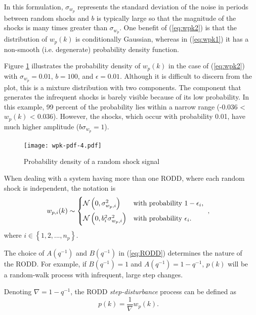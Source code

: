 In this formulation, $\sigma_{w_p}$ represents the standard deviation of the noise in periods between random shocks and $b$ is typically large so that the magnitude of the shocks is many times greater than $\sigma_{w_p}$. One benefit of (\ref{eq:wpk2}) is that the distribution of $w_p(k)$ is conditionally Gaussian, whereas in (\ref{eq:wpk1}) it has a non-smooth (i.e. degenerate) probability density function.

Figure \ref{fig:wpk-pdf} illustrates the probability density of $w_p(k)$ in the case of (\ref{eq:wpk2}) with $\sigma_{w_p}=0.01$, $b=100$, and $\epsilon=0.01$. Although it is difficult to discern from the plot, this is a mixture distribution with two components. The component that generates the infrequent shocks is barely visible because of its low probability. In this example, 99 percent of the probability lies within a narrow range (-0.036 < $w_p(k)$ < 0.036). However, the shocks, which occur with probability 0.01, have much higher amplitude ($b\sigma_{w_p}=1$).

\begin{figure}[htp]
	\centering
	\texttt{[image: wpk-pdf-4.pdf]}
	\caption{Probability density of a random shock signal}
	\label{fig:wpk-pdf}
\end{figure}

When dealing with a system having more than one RODD, where each random shock is independent, the notation is
\begin{equation} \label{eq:wpik2}
	w_{p,i}(k) \sim 
	\begin{cases*}
		\mathcal{N}\left(0, \sigma_{w_p,i}^2\right) & with probability $1-\epsilon_i$, \\
		\mathcal{N}\left(0, b_i^2\sigma_{w_p,i}^2\right) & with probability $\epsilon_i$.
	\end{cases*},
\end{equation}
where $i \in \left\{1, 2, ..., n_p\right\}$.

The choice of $A(q^{-1})$ and $B(q^{-1})$ in (\ref{eq:RODD}) determines the nature of the RODD. For example, if $B(q^{-1})=1$ and $A(q^{-1})=1-q^{-1}$, $p(k)$ will be a random-walk process with infrequent, large step changes.

Denoting $\nabla=1-q^{-1}$, the RODD \textit{step-disturbance} process can be defined as
\begin{equation} \label{eq:RODD-step}
	p(k)= \frac{1}{\nabla}w_p(k).
\end{equation}

